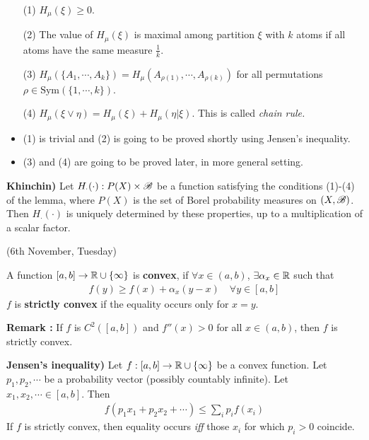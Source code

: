 \documentclass[12pt,a4paper]{report}
\newenvironment{proof}
{\begin{changemargin}{1cm}{0.5cm} 
	}%
	{\end{changemargin}
}
\begin{document}
\lem
\begin{itemize}
\item[(1)] $H_{\mu} (\xi) \geq 0$.
\item[(2)] The value of $H_{\mu}(\xi)$ is maximal among partition $\xi$ with $k$ atoms if all atoms have the same measure $\frac{1}{k}$.
\item[(3)] $H_{\mu}(\{A_1, \cdots, A_k \}) = H_{\mu}(A_{\rho (1)}, \cdots, A_{\rho (k)})$ for all permutations $\rho \in \text{Sym}(\{1,\cdots,k\})$.
\item[(4)] $H_{\mu} (\xi \vee \eta) = H_{\mu}(\xi) + H_{\mu}(\eta |\xi)$. This is called \emph{chain rule.}
\end{itemize}
\begin{proof}
\pf \begin{itemize}
\item (1) is trivial and (2) is going to be proved shortly using Jensen's inequality.
\item (3) and (4) are going to be proved later, in more general setting.
\end{itemize}
\end{proof}
\s

\textbf{Khinchin)} Let $H_{\cdot}(\cdot) : P(X) \times \mathscr{B}$ be a function satisfying the conditions (1)-(4) of the lemma, where $P(X)$ is the set of Borel probability measures on $(X,\mathscr{B})$. Then $H_{\cdot}(\cdot)$ is uniquely determined by these properties, up to a multiplication of a scalar factor.
\s

\newday
\s

(6th November, Tuesday)

 A function $[a,b] \rightarrow \mathbb{R} \cup \{ \infty \}$ is \textbf{convex}, if $\forall x \in (a,b)$, $\exists \alpha_x \in \mathbb{R}$ such that
\begin{align*}
f(y) \geq f(x) + \alpha_x (y-x) \quad \forall y \in [a,b]
\end{align*}
$f$ is \textbf{strictly convex} if the equality occurs only for $x=y$. 
\s

\textbf{Remark :} If $f$ is $C^2([a,b])$ and $f''(x) >0$ for all $x\in (a,b)$, then $f$ is strictly convex.
\s

\textbf{Jensen's inequality)} Let $f:[a,b] \rightarrow \mathbb{R} \cup \{\infty\}$ be a convex function. Let $p_1, p_2, \cdots$ be a probability vector (possibly countably infinite). Let $x_1, x_2, \cdots \in [a,b]$. Then
\begin{align*}
f(p_1 x_1 + p_2 x_2 + \cdots) \leq \sum_i p_i f(x_i)
\end{align*}
If $f$ is strictly convex, then equality occurs \emph{iff} those $x_i$ for which $p_i >0$ coincide.
\s
\end{document}
